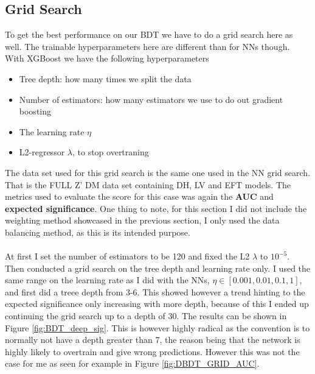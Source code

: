\documentclass[14pt, a4paper]{book}
\begin{document}
\clearpage
\subsection{Grid Search}\label{sec:BDTGriddy}
To get the best performance on our BDT we have to do a grid search here as well. The trainable hyperparameters here are different than for NNs though. 
With XGBoost we have the following hyperparameters
\begin{itemize}
   \item Tree depth: how many times we split the data
   \item Number of estimators: how many estimators we use to do out gradient boosting
   \item The learning rate $\eta$
   \item L2-regressor $\lambda$, to stop overtraning
\end{itemize}
The data set used for this grid search is the same one used in the NN grid search. That is the FULL Z' DM data set containing DH, LV and EFT models. 
The metrics used to evaluate the score for this case was again the \textbf{AUC} and \textbf{expected significance}. One thing to note, for this section I did not include the weighting method showcased in the previous section,
I only used the data balancing method, as this is its intended purpose.\\
\\At first I set the number of estimators to be 120 and fixed the L2 $\lambda$ to $10^{-5}$. Then conducted a grid search on the tree depth and learning rate only. 
I used the same range on the learning rate as I did with the NNs, $\eta \in [0.001, 0.01, 0.1, 1]$, and first did a treee depth from 3-6. 
This showed however a trend hinting to the expected significance only increasing with more depth, because of this I ended up continuing the grid search up to a depth of 30.
The results can be shown in Figure \ref{fig:BDT_deep_sig}. This is however highly radical as the convention is to normally not have a depth greater than 7, 
the reason being that the network is highly likely to overtrain and give wrong predictions. However this was not the case for me as seen for example in Figure \ref{fig:DBDT_GRID_AUC}.
\graphicspath{{../../../Plots/XGBoost/FULL/GRIDSEARCH_3-6}}
\end{document}
